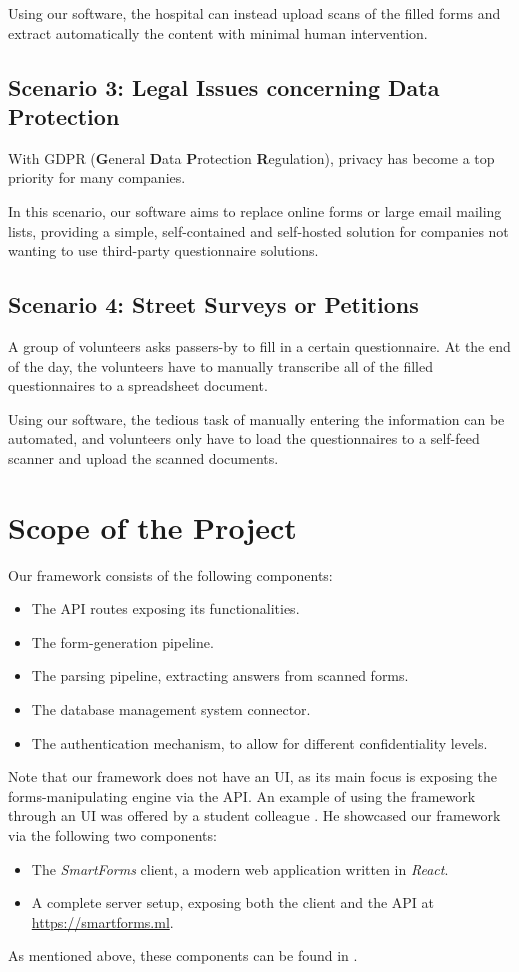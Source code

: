 \documentclass[11pt, a4paper]{report}
\begin{document}
Using our software, the hospital can instead upload scans of the filled forms and extract automatically the content with minimal human intervention.

\subsection*{Scenario 3:  Legal Issues concerning Data Protection}

With GDPR (\textbf{G}eneral \textbf{D}ata \textbf{P}rotection \textbf{R}egulation), privacy has become a top priority for many companies.

In this scenario, our software aims to replace online forms or large email mailing lists, providing a simple, self-contained and self-hosted solution for companies not wanting to use third-party questionnaire solutions.

\subsection*{Scenario 4: Street Surveys or Petitions}

A group of volunteers asks passers-by to fill in a certain questionnaire. At the end of the day, the volunteers have to manually transcribe all of the filled questionnaires to a spreadsheet document.

Using our software, the tedious task of manually entering the information can be automated, and volunteers only have to load the questionnaires to a self-feed scanner and upload the scanned documents.

\section{Scope of the Project}

Our framework consists of the following components:
\begin{itemize}
	\item The API routes exposing its functionalities.
	\item The form-generation pipeline.
	\item The parsing pipeline, extracting answers from scanned forms.
	\item The database management system connector.
	\item The authentication mechanism, to allow for different confidentiality levels.
\end{itemize}

Note that our framework does not have an UI, as its main focus is exposing the forms-manipulating engine via the API. An example of using the framework through an UI was offered by a student colleague \cite{felix}. He showcased our framework via the following two components:
\begin{itemize}
	\item The \textit{SmartForms} client, a modern web application written in \textit{React}.
	\item A complete server setup, exposing both the client and the API at \url{https://smartforms.ml}.
\end{itemize}
As mentioned above, these components can be found in \cite{felix}.
\end{document}
